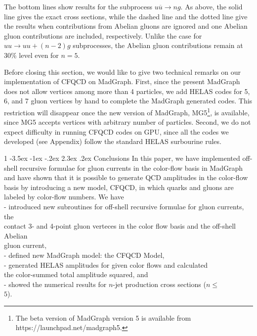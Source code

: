 \documentclass[a4paper,11pt]{article}
\makeatletter
\renewcommand{\section}{%
  \@startsection{section}%
   {1}%
   {\z@}%
   {-3.5ex \@plus -1ex \@minus -.2ex}%
   {2.3ex \@plus.2ex}%
   {\normalfont\large\bfseries}%
}%
\makeatother
\begin{document}
 The bottom lines show results for the subprocess
 $u\overline{u}\rightarrow ng$. As above, the solid line gives
 the exact cross sections, while
 the dashed line and the dotted line give the results when contributions
 from Abelian gluons are ignored and one Abelian gluon contributions are
 included, respectively.
Unlike the case for $uu \to uu+(n-2)g$ subprocesses,
 the Abelian gluon contributions remain at 30\% level
 even for $n=5$.

  Before closing this section, we would like to give two
 technical remarks on our implementation of CFQCD on MadGraph.
 First, since the present MadGraph\cite{MG/ME} does not allow vertices
 among more than 4 particles, we add HELAS codes for 5, 6,
 and 7 gluon vertices by hand to complete the MadGraph
 generated codes.
 This restriction will disappear once the new version of
 MadGraph, MG5\footnote{The beta version of MadGraph version 5 is
 available from https://launchpad.net/madgraph5.},
 is available, since MG5 accepts
 vertices with arbitrary number of particles.
 Second, we do not expect difficulty in running CFQCD codes
 on GPU, since all the codes we developed (see Appendix)
 follow the standard HELAS surbourine rules.

\section{Conclusions}
 In this paper, we have implemented off-shell recursive
 formulae for gluon currents in the color-flow basis in MadGraph and have
 shown that it is possible to generate QCD amplitudes
 in the color-flow basis by introducing a new model,
 CFQCD, in which quarks and gluons are labeled by
 color-flow numbers.
 We have\\

 \noindent
 - introduced new subroutines for off-shell recursive
 formulae for gluon currents, the\\
 \hspace{0.4em} contact 3- and 4-point gluon verteces
 in the color flow basis and the off-shell Abelian\\
 \hspace{0.4em}gluon current,\\
 - defined new MadGraph model: the CFQCD Model,\\
 - generated HELAS amplitudes for given color flows
 and calculated\\
 \hspace{0.6em} the color-summed total amplitude squared,
 and \\
 - showed the numerical results for $n$-jet production
 cross sections ($n\leq$\\ \hspace{0.6em}$5$).\\
\end{document}
